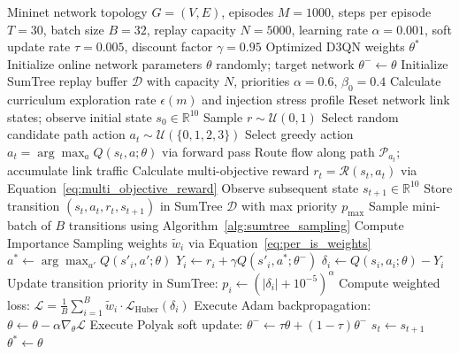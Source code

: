\begin{algorithm}[htbp]
\caption{Complete D3QN-PER Adaptive Traffic Engineering Training Pipeline}
\label{alg:d3qn_complete_loop}
\begin{algorithmic}[1]
\REQUIRE Mininet network topology $G = (V, E)$, episodes $M = 1000$, steps per episode $T = 30$, batch size $B = 32$, replay capacity $N = 5000$, learning rate $\alpha = 0.001$, soft update rate $\tau = 0.005$, discount factor $\gamma = 0.95$
\ENSURE Optimized D3QN weights $\theta^*$
\STATE Initialize online network parameters $\theta$ randomly; target network $\theta^- \gets \theta$
\STATE Initialize SumTree replay buffer $\mathcal{D}$ with capacity $N$, priorities $\alpha = 0.6$, $\beta_0 = 0.4$
    \STATE Calculate curriculum exploration rate $\epsilon(m)$ and injection stress profile
    \STATE Reset network link states; observe initial state $s_0 \in \mathbb{R}^{10}$
        \STATE Sample $r \sim \mathcal{U}(0, 1)$
            \STATE Select random candidate path action $a_t \sim \mathcal{U}(\{0, 1, 2, 3\})$
        \ELSE
            \STATE Select greedy action $a_t = \arg\max_{a} Q(s_t, a; \theta)$ via forward pass
        \ENDIF
        \STATE Route flow along path $\mathcal{P}_{a_t}$; accumulate link traffic
        \STATE Calculate multi-objective reward $r_t = \mathcal{R}(s_t, a_t)$ via Equation~\ref{eq:multi_objective_reward}
        \STATE Observe subsequent state $s_{t+1} \in \mathbb{R}^{10}$
        \STATE Store transition $(s_t, a_t, r_t, s_{t+1})$ in SumTree $\mathcal{D}$ with max priority $p_{\text{max}}$
            \STATE Sample mini-batch of $B$ transitions using Algorithm~\ref{alg:sumtree_sampling}
            \STATE Compute Importance Sampling weights $\tilde{w}_i$ via Equation~\ref{eq:per_is_weights}
                \STATE $a^* \gets \arg\max_{a'} Q(s'_{i}, a'; \theta)$ 
                \STATE $Y_i \gets r_i + \gamma Q(s'_{i}, a^*; \theta^-)$ 
                \STATE $\delta_i \gets Q(s_i, a_i; \theta) - Y_i$ 
                \STATE Update transition priority in SumTree: $p_i \gets (|\delta_i| + 10^{-5})^\alpha$
            \ENDFOR
            \STATE Compute weighted loss: $\mathcal{L} = \frac{1}{B}\sum_{i=1}^B \tilde{w}_i \cdot \mathcal{L}_{\text{Huber}}(\delta_i)$
            \STATE Execute Adam backpropagation: $\theta \gets \theta - \alpha \nabla_\theta \mathcal{L}$
            \STATE Execute Polyak soft update: $\theta^- \gets \tau \theta + (1 - \tau) \theta^-$
        \ENDIF
        \STATE $s_t \gets s_{t+1}$
    \ENDFOR
\ENDFOR
\RETURN $\theta^* \gets \theta$
\end{algorithmic}
\end{algorithm}

